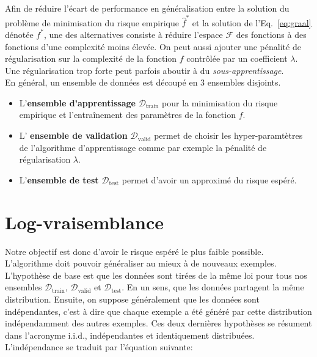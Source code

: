 Afin de réduire l'écart de performance en généralisation entre la solution du
problème de minimisation du risque empirique $\hat{f}^*$ et la solution de
l'Eq.~\ref{eq:graal} dénotée $f^*$, une des alternatives consiste à réduire
l'espace $\mathcal{F}$ des fonctions à des fonctions d'une complexité moins
élevée. On peut aussi ajouter une pénalité de régularisation sur la complexité
de la fonction $f$ contrôlée par un coefficient $\lambda$. Une régularisation
trop forte peut parfois aboutir à du \emph{sous-apprentissage}.  \\

En général, un ensemble de données est découpé en $3$ ensembles disjoints.


\begin{itemize}

\item L'{\bf ensemble d'apprentissage} $\mathcal{D}_\textrm{train}$ pour la
minimisation du risque empirique et l'entraînement des paramètres de la
fonction $f$.

\item L' {\bf ensemble de validation} $\mathcal{D_{\mathrm{valid}}}$ permet de
choisir les hyper-paramtètres de l'algorithme d'apprentissage comme par exemple
la pénalité de régularisation $\lambda$.

\item L'{\bf ensemble de test} $\mathcal{D_{\mathrm{test}}}$  permet d'avoir un
approximé du risque espéré.

\end{itemize}

\section{Log-vraisemblance}

Notre objectif est donc d'avoir le risque espéré le plus faible possible.
L'algorithme doit pouvoir généraliser au mieux à de nouveaux exemples.
L'hypothèse de base est que les données sont tirées de la même loi pour tous
nos ensembles $\mathcal{D}_\textrm{train}$, $\mathcal{D_{\mathrm{valid}}}$ et
$\mathcal{D_{\mathrm{test}}}$. En un sens, que les données partagent la même
distribution.  Ensuite, on suppose généralement que les données sont
indépendantes, c'est à dire que chaque exemple a été généré par cette
distribution indépendamment des autres exemples.  Ces deux dernières hypothèses
se résument dans l'acronyme i.i.d., indépendantes et identiquement distribuées.
L'indépendance se traduit par l'équation suivante:


